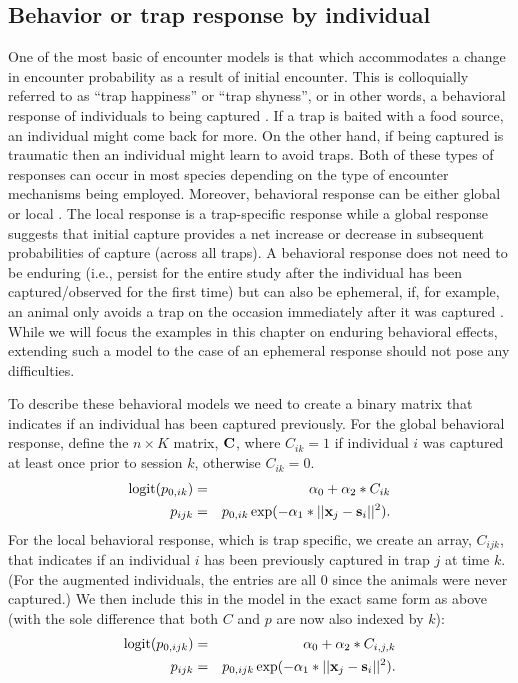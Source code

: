 \subsection{Behavior or trap response by individual}
\label{covariates.sec.behavior}

One of the most basic of encounter models is that which accommodates a
change in encounter probability as a result of initial encounter.
This is colloquially referred to as ``trap happiness'' or ``trap shyness'', or in other words, a
behavioral response of individuals to being captured \citep{otis_etal:1978}.
If a trap is baited
with a food source, an individual might come back for
more. On the other hand, if being captured is traumatic then an
individual might learn to avoid traps. Both of these types of
responses can occur in most species depending on the type of encounter
mechanisms being employed. Moreover, behavioral response can be either
global \citep{gardner_etal:2010jwm} or local  \citep{royle_etal:2011jwm}.
The local response is a trap-specific response 
while a global response suggests that initial capture provides a net
increase or decrease in subsequent probabilities of capture (across
all traps). A behavioral response does not need to be enduring (i.e., persist
for the entire study after the individual has been captured/observed
for the first time) but can also be ephemeral, if, for example, an
animal only avoids a trap on the occasion immediately after it was
captured \citep{yang_chao:2005, royle:2008}. While we will focus the
examples in this chapter on enduring behavioral effects, extending
such a model to the case of an ephemeral response should not pose any
difficulties.

To describe these behavioral models we need to create a binary matrix that indicates
if an individual has been captured previously.  For the global
behavioral response, define the $n \times K$ matrix,
${\bf C}$, where $C_{ik} =1$
if individual $i$ was captured at least once prior to session
$k$, otherwise $C_{ik} = 0$.
\begin{eqnarray*}
\mbox{logit}(p_{0,ik})& =& \alpha_{0} + \alpha_{2}*C_{ik} \\
p_{ijk} &= &p_{0,ik} \exp(- \alpha_{1}*||{\bf x}_{j}-{\bf s}_{i}||^2).
\end{eqnarray*}
For the local behavioral response, which is trap specific, we create
an array, $C_{ijk}$, that indicates if an individual $i$ has been
previously captured in trap $j$ at time $k$. (For the augmented individuals, the entries
are all 0 since the animals were never captured.)  We then include this in
the model in the exact same form as above (with the sole difference that both $C$ and $p$ 
are now also indexed by $k$):
\begin{eqnarray*}
\mbox{logit}(p_{0,ijk}) &= &\alpha_{0} + \alpha_{2}*C_{i,j,k} \\
          p_{ijk} &= &  p_{0,ijk} \exp(- \alpha_{1}*||{\bf x}_{j}-{\bf s}_{i}||^2).
\end{eqnarray*}

